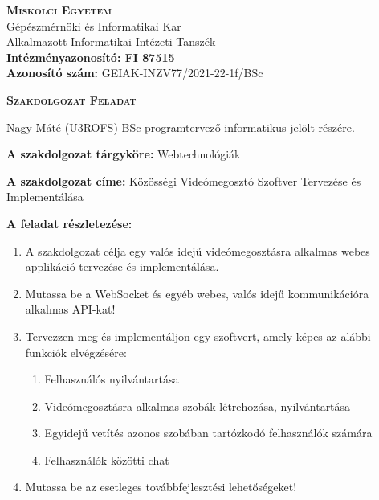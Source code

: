 \begin{small}
    \begin{flushleft}
        \textsc{\bfseries Miskolci Egyetem}\\
        Gépészmérnöki és Informatikai Kar\\
        Alkalmazott Informatikai Intézeti Tanszék\hspace*{4cm}\hfil\\\textbf{Intézményazonosító: FI 87515}\\
        {\textbf{Azonos\'it\'o szám:} GEIAK-INZV77/2021-22-1f/BSc}
    \end{flushleft}
    \vskip 0.3cm
    \begin{center}
        \large\textsc{\bfseries Szakdolgozat Feladat}
    \end{center}
    \vskip 0.3cm
    Nagy Máté (U3ROFS) BSc programtervez\H o informatikus jelölt részére.\newline

    \noindent\textbf{A szakdolgozat tárgyköre:} Webtechnológiák\newline

    \noindent\textbf{A szakdolgozat címe:} Közösségi Videómegosztó Szoftver Tervezése és Implementálása\newline

    \noindent\textbf{A feladat részletezése:}

    \begin{enumerate}
        \item A szakdolgozat célja egy valós idejű videómegosztásra alkalmas webes applikáció tervezése és implementálása.
        \item Mutassa be a WebSocket és egyéb webes, valós idejű kommunikációra alkalmas API-kat!
        \item Tervezzen meg \'es implement\'aljon egy szoftvert, amely k\'epes az al\'abbi funkci\'ok elvégzésére:
              \begin{enumerate} 
                  \item Felhasználós nyilvántartása
                  \item Videómegosztásra alkalmas szobák létrehozása, nyilvántartása
                  \item Egyidejű vetítés azonos szobában tartózkodó felhasználók számára
                  \item Felhasználók közötti chat
              \end{enumerate}
        \item Mutassa be az esetleges tov\'abbfejleszt\'esi lehet\H os\'egeket!
    \end{enumerate}


\end{small}

